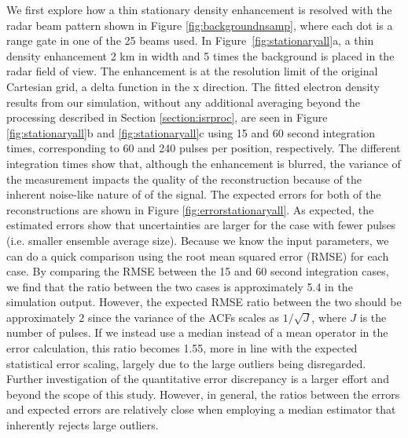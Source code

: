 We first explore how a thin stationary density enhancement is resolved with the radar beam pattern shown in Figure \ref{fig:backgroundnsamp}, where each dot is a range gate in one of the 25 beams used. In Figure~\ref{fig:stationaryall}a, a thin density enhancement 2 km in width and 5 times the background is placed in the radar field of view. The enhancement is at the resolution limit of the original Cartesian grid, a delta function in the x direction.  The fitted electron density results from our simulation, without any additional averaging beyond the processing described in Section \ref{section:isrproc},
are seen in Figure \ref{fig:stationaryall}b and \ref{fig:stationaryall}c using 15 and 60 second integration times, corresponding to 60 and 240 pulses per position, respectively. The different integration times show that, although the enhancement is blurred, the variance of the measurement impacts the quality of the reconstruction because of the inherent noise-like nature of of the signal. The expected errors for both of the reconstructions are shown in Figure \ref{fig:errorstationaryall}. As expected, the estimated errors show that uncertainties are larger for the case with fewer pulses (i.e. smaller ensemble average size). 
Because we know the input parameters, we can do a quick comparison using the root mean squared error (RMSE) for each case. By comparing the RMSE between the 15 and 60 second integration cases, we find that the ratio between the two cases is approximately 5.4 in the simulation output.  However, the expected RMSE ratio between the two should be approximately 2 since the variance of the ACFs scales as $1/\sqrt{J}$, where $J$ is the number of pulses. If we instead use a median instead of a mean operator in the error calculation, this ratio becomes 1.55, more in line with the expected statistical error scaling, largely due to the large outliers being disregarded.  Further investigation of the quantitative error discrepancy is a larger effort and beyond the scope of this study.  However, in general, the ratios between the errors and expected errors are relatively close when employing a median estimator that inherently rejects large outliers.
